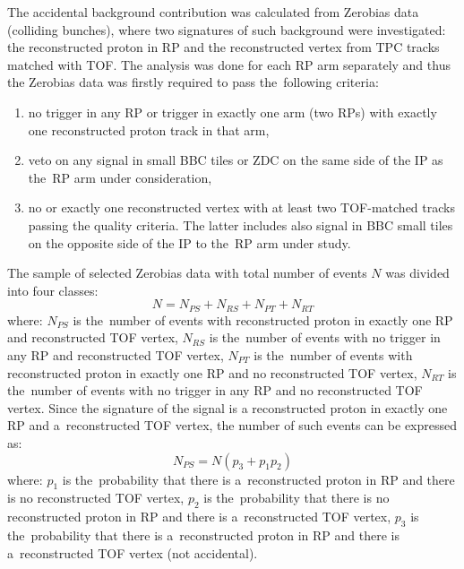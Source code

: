 The accidental background contribution was calculated  from Zerobias data (colliding bunches), where two signatures of such background were investigated: the reconstructed proton in RP and the reconstructed vertex from TPC tracks matched with TOF. The analysis was done for each RP arm separately and thus the 
Zerobias data was firstly required to pass the~following criteria:
\begin{enumerate}
	\item no trigger in any RP or trigger in exactly one arm (two RPs) with exactly one reconstructed proton track in that arm,
	\item veto on any signal in small BBC tiles or ZDC on the same  side of the IP as  the~RP arm under consideration,
	\item no or exactly one reconstructed vertex with at least two TOF-matched tracks passing the quality criteria. The latter includes also signal in BBC small tiles on the opposite side of the IP to the~RP arm under study. 
\end{enumerate}
The sample of selected Zerobias data with total  number  of events $N$ was divided into four classes:
\begin{equation}
N=N_{PS}+N_{RS}+N_{PT}+N_{RT}
\label{eq:accidentalSTAR_N}
\end{equation}
where: $N_{PS}$ is the~number of events with reconstructed proton in exactly one RP and reconstructed TOF vertex, $N_{RS}$  is the~number of events with no trigger in any RP and reconstructed TOF vertex, $N_{PT}$ is the~number of events with reconstructed proton in exactly one RP and no reconstructed TOF vertex, $N_{RT}$ is the~number of events with no trigger in any RP and no reconstructed TOF vertex.
Since the signature of the signal is a reconstructed proton in exactly one RP and a~reconstructed TOF vertex, the number of such events can be expressed as:
\begin{equation}
N_{PS}=N\left(p_3+p_1p_2\right)
\end{equation}
where: $p_1$ is the~probability that there is a~reconstructed proton in RP and there is no reconstructed TOF vertex, $p_2$ is the~probability that there is no reconstructed proton in RP and  there is a~reconstructed TOF vertex, $p_3$ is the~probability that there is a~reconstructed proton in RP and  there is a~reconstructed TOF vertex (not accidental).

